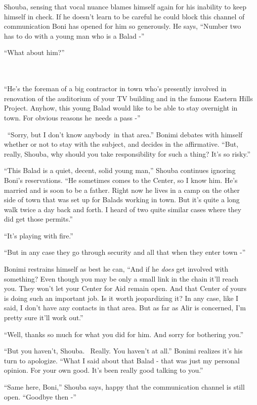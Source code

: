 \documentclass[twoside,11pt]{book}
\begin{document}
Shouba, sensing that vocal nuance blames himself again for his inability to keep himself in check. If he doesn't learn
to be careful he could block this channel of communication Boni has opened for him so generously. He says,
``Number two has to do with a young man who is a Balad -''

``What about him?''
~~~~~~~~~~~~~~~~~~~~~~~~~~~~~~~~~~~~~~~~~~~~~~~~~~~~~~~~~~~~~~~~~~~~~~~~~~~~~~

``He's the foreman of a big contractor in town who's presently involved in renovation of the auditorium of
your TV building and in the famous Eastern Hills Project. Anyhow, this young Balad would like to be able to stay
overnight in town. For obvious reasons he~needs a pass -''

~``Sorry, but I don't know anybody~in that area.'' Bonimi debates with himself whether or not
to stay with the subject, and decides in the affirmative. ``But, really, Shouba, why should you take
responsibility for such a thing? It's so risky.''

``This Balad is a quiet, decent, solid young man,'' Shouba continues ignoring Boni's
reservations. ``He sometimes comes to the Center, so I know him. He's married and is soon to be a father.
Right now he lives in a camp on the other side of town that was set up for Balads working in town. But it's quite a
long walk twice a day back and forth. I heard of two quite similar cases where they did get those
permits.''

``It's playing with fire.''

``But in any case they go through security and all that when they enter town -''

Bonimi restrains himself as best he can, ``And if he \textit{does} get involved with something? Even though
you may be only a small link in the chain it'll reach you. They won't let your Center for Aid remain open. And that
Center of yours is doing such an important job. Is it worth jeopardizing it? In any case, like I said, I don't have any
contacts in that area. But as far as Alir is concerned, I'm pretty sure it'll work out.''

``Well, thanks so much for what you did for him. And sorry for bothering you.''

``But you haven't, Shouba. \ Really. You haven't at all.'' Bonimi realizes it's his turn to
apologize. ``What I said about that Balad - that was just my personal opinion. For your own good. It's
been really good{ }talking to you.''

``Same here, Boni,'' Shouba says, happy that the communication channel is still open.
``Goodbye then -''
\end{document}
